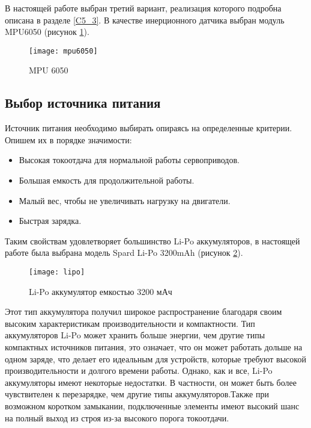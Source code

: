 В настоящей работе выбран третий вариант, реализация которого подробна описана в разделе \ref{C5_3}. В качестве инерционного датчика выбран модуль MPU6050 (рисунок \ref{mpu6050}).
\newpage
\begin{figure}[h!]
	\begin{center}
		\texttt{[image: mpu6050]}
		\caption{MPU 6050}
		\label{mpu6050}
	\end{center}
\end{figure}

\subsection{Выбор источника питания}\label{C4_4_4}
Источник питания необходимо выбирать опираясь на определенные критерии. Опишем их в порядке значимости:
\begin{itemize}
	\item Высокая токоотдача для нормальной работы сервоприводов.
	\item Большая емкость для продолжительной работы.
	\item Малый вес, чтобы не увеличивать нагрузку на двигатели.
	\item Быстрая зарядка.
\end{itemize}

Таким свойствам удовлетворяет большинство Li-Po аккумуляторов, в настоящей работе была выбрана модель Spard Li-Po 3200mAh (рисунок \ref{lipo}).
\begin{figure}[h!]
	\begin{center}
		\texttt{[image: lipo]}
		\caption{Li-Po аккумулятор емкостью 3200 мАч}
		\label{lipo}
	\end{center}
\end{figure}
Этот тип аккумулятора получил широкое распространение благодаря своим высоким характеристикам производительности и компактности. Тип аккумуляторов Li-Po может хранить больше энергии, чем другие типы компактных источников питания, это означает, что он может работать дольше на одном заряде, что делает его идеальным для устройств, которые требуют высокой производительности и долгого времени работы. Однако, как и все, Li-Po аккумуляторы имеют некоторые недостатки. В частности, он может быть более чувствителен к перезарядке, чем другие типы аккумуляторов.Также при возможном коротком замыкании, подключенные элементы имеют высокий шанс на полный выход из строя из-за высокого порога токоотдачи. 

